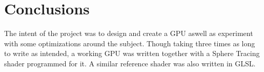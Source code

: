 \chapter{Conclusions}

The intent of the project was to design and create a GPU aswell as experiment
with some optimizations around the subject. Though taking three times as long
to write as intended, a working GPU was written together with a Sphere Tracing
shader programmed for it. A similar reference shader was also written in GLSL.
